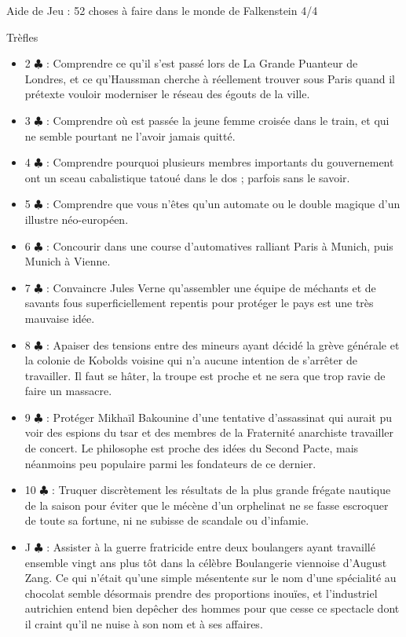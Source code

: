 \documentclass[a5paper,pagesize,french]{book}
\begin{document}
\clearpage

\begin{center}
	{ \LARGE{ \setmainfont{Z003} Aide de Jeu : 52 choses à faire dans le monde de Falkenstein 4/4 } }
\end{center}


Trèfles
\begin{itemize}
	\item[] 2{ $\clubsuit$ } : Comprendre ce qu'il s'est passé lors de La Grande Puanteur de Londres, et ce qu'Haussman cherche à réellement trouver sous Paris quand il prétexte vouloir moderniser le réseau des égouts de la ville.
	\item[] 3{ $\clubsuit$ } : Comprendre où est passée la jeune femme croisée dans le train, et qui ne semble pourtant ne l'avoir jamais quitté.
	\item[] 4{ $\clubsuit$ } : Comprendre pourquoi plusieurs membres importants du gouvernement ont un sceau cabalistique tatoué dans le dos ; parfois sans le savoir.
	\item[] 5{ $\clubsuit$ } : Comprendre que vous n'êtes qu'un automate ou le double magique d'un illustre néo-européen.
	\item[] 6{ $\clubsuit$ } : Concourir dans une course d'automatives ralliant Paris à Munich, puis Munich à Vienne.
	\item[] 7{ $\clubsuit$ } : Convaincre Jules Verne qu'assembler une équipe de méchants et de savants fous superficiellement repentis pour protéger le pays est une très mauvaise idée.
	\item[] 8{ $\clubsuit$ } : Apaiser des tensions entre des mineurs ayant décidé la grève générale et la colonie de Kobolds voisine qui n'a aucune intention de s'arrêter de travailler. Il faut se hâter, la troupe est proche et ne sera que trop ravie de faire un massacre.
	\item[] 9{ $\clubsuit$ } : Protéger Mikhaïl Bakounine d'une tentative d'assassinat qui aurait pu voir des espions du tsar et des membres de la Fraternité anarchiste travailler de concert. Le philosophe est proche des idées du Second Pacte, mais néanmoins peu populaire parmi les fondateurs de ce dernier.
	\item[] 10{ $\clubsuit$ } : Truquer discrètement les résultats de la plus grande frégate nautique de la saison pour éviter que le mécène d'un orphelinat ne se fasse escroquer de toute sa fortune, ni ne subisse de scandale ou d'infamie. 
	\item[] J{ $\clubsuit$ } : Assister à la guerre fratricide entre deux boulangers ayant travaillé ensemble vingt ans plus tôt dans la célèbre Boulangerie viennoise d'August Zang. Ce qui n'était qu'une simple mésentente sur le nom d'une spécialité au chocolat semble désormais prendre des proportions inouïes, et l'industriel autrichien entend bien depêcher des hommes pour que cesse ce spectacle dont il craint qu'il ne nuise à son nom et à ses affaires.

\end{itemize}
\end{document}
